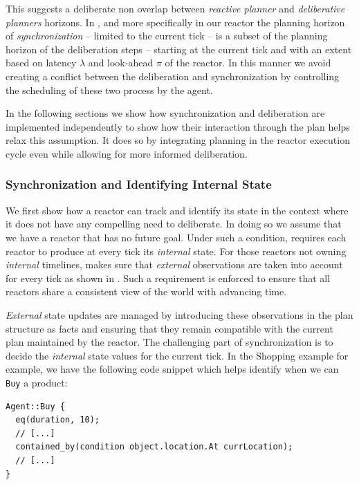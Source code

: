 This suggests a deliberate non overlap between {\em reactive planner}
and {\em deliberative planners} horizons. In \rxe, and more
specifically in our \eu reactor the planning horizon of {\em
  synchronization} -- limited to the current tick -- is a subset of
the planning horizon of the deliberation steps -- starting at the
current tick and with an extent based on latency $\lambda$ and
look-ahead $\pi$ of the reactor. In this manner we avoid creating a
conflict between the deliberation and synchronization by controlling
the scheduling of these two process by the \rx agent.

In the following sections we show how synchronization and deliberation
are implemented independently to show how their interaction through
the plan helps relax this assumption. It does so by integrating
planning in the reactor execution cycle even while allowing for more
informed deliberation.

\subsubsection{Synchronization and Identifying Internal State}
\label{sec:arch:synch}

We first show how a reactor can track and identify its state in the
context where it does not have any compelling need to deliberate. In
doing so we assume that we have a reactor that has no future
goal. Under such a condition, \rx requires each reactor to produce at
every tick its {\em internal} state. For those reactors not owning
{\em internal} timelines, \rx makes sure that {\em external}
observations are taken into account for every tick as shown in
\cite{py10}. Such a requirement is enforced to ensure that all
reactors share a consistent view of the world with advancing time.

{\em External} state updates are managed by introducing these
observations in the plan structure as facts and ensuring that they
remain compatible with the current plan maintained by the reactor. The
challenging part of synchronization is to decide the {\em internal}
state values for the current tick. In the Shopping example for example,
we have the following code snippet which helps identify when we can
\texttt{Buy} a product:

\begin{verbatim}
Agent::Buy {
  eq(duration, 10);
  // [...]
  contained_by(condition object.location.At currLocation);
  // [...]
}
\end{verbatim}

